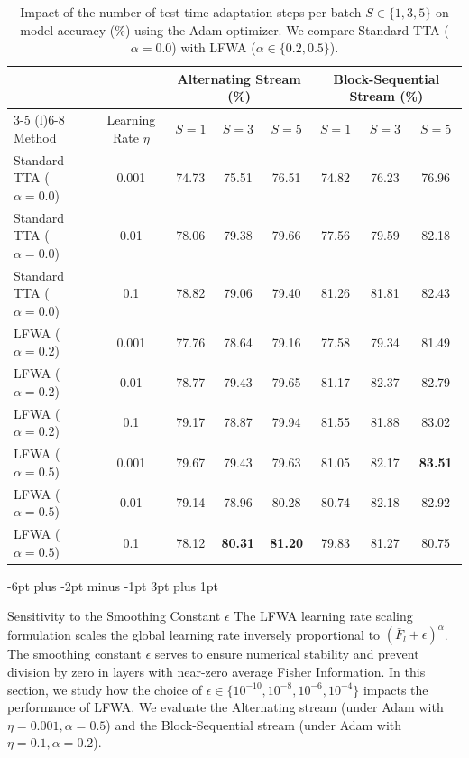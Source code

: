 \documentclass{article}
\makeatletter
\theoremstyle{plain}
\theoremstyle{definition}
\theoremstyle{remark}
\renewcommand{\subsection}{\@startsection{subsection}{2}{\z@}%
                          {-6pt plus -2pt minus -1pt}%
                          {3pt plus 1pt}%
                          {\normalfont\normalsize\bfseries\raggedright}}
\makeatother
\begin{document}
\begin{table}[htbp]
\caption{Impact of the number of test-time adaptation steps per batch $S \in \{1, 3, 5\}$ on model accuracy (\%) using the Adam optimizer. We compare Standard TTA ($\alpha=0.0$) with LFWA ($\alpha \in \{0.2, 0.5\}$).}
\label{tab:steps_ablation}
\vskip 0.15in
\begin{center}
\begin{small}
\begin{tabular}{lccccccc}
\toprule
& & \multicolumn{3}{c}{\textbf{Alternating Stream (\%)}} & \multicolumn{3}{c}{\textbf{Block-Sequential Stream (\%)}} \\
\cmidrule(r){3-5} \cmidrule(l){6-8}
Method & Learning Rate $\eta$ & $S=1$ & $S=3$ & $S=5$ & $S=1$ & $S=3$ & $S=5$ \\
\midrule
Standard TTA ($\alpha = 0.0$) & 0.001 & 74.73 & 75.51 & 76.51 & 74.82 & 76.23 & 76.96 \\
Standard TTA ($\alpha = 0.0$) & 0.01  & 78.06 & 79.38 & 79.66 & 77.56 & 79.59 & 82.18 \\
Standard TTA ($\alpha = 0.0$) & 0.1   & 78.82 & 79.06 & 79.40 & 81.26 & 81.81 & 82.43 \\
\midrule
LFWA ($\alpha = 0.2$)         & 0.001 & 77.76 & 78.64 & 79.16 & 77.58 & 79.34 & 81.49 \\
LFWA ($\alpha = 0.2$)         & 0.01  & 78.77 & 79.43 & 79.65 & 81.17 & 82.37 & 82.79 \\
LFWA ($\alpha = 0.2$)         & 0.1   & 79.17 & 78.87 & 79.94 & 81.55 & 81.88 & 83.02 \\
\midrule
LFWA ($\alpha = 0.5$)         & 0.001 & 79.67 & 79.43 & 79.63 & 81.05 & 82.17 & \textbf{83.51} \\
LFWA ($\alpha = 0.5$)         & 0.01  & 79.14 & 78.96 & 80.28 & 80.74 & 82.18 & 82.92 \\
LFWA ($\alpha = 0.5$)         & 0.1   & 78.12 & \textbf{80.31} & \textbf{81.20} & 79.83 & 81.27 & 80.75 \\
\bottomrule
\end{tabular}
\end{small}
\end{center}
\end{table}

\subsection{Sensitivity to the Smoothing Constant $\epsilon$}
The LFWA learning rate scaling formulation scales the global learning rate inversely proportional to $(\bar{F}_l + \epsilon)^\alpha$. The smoothing constant $\epsilon$ serves to ensure numerical stability and prevent division by zero in layers with near-zero average Fisher Information. In this section, we study how the choice of $\epsilon \in \{10^{-10}, 10^{-8}, 10^{-6}, 10^{-4}\}$ impacts the performance of LFWA. We evaluate the Alternating stream (under Adam with $\eta=0.001, \alpha=0.5$) and the Block-Sequential stream (under Adam with $\eta=0.1, \alpha=0.2$).
\end{document}
